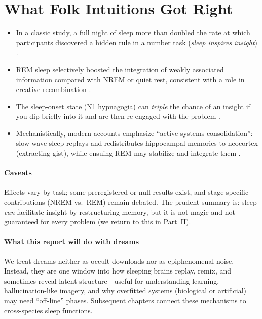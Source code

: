 \section{What Folk Intuitions Got Right}\label{sec:reconstructing}

\begin{itemize}
  \item In a classic study, a full night of sleep more than doubled the rate at which participants discovered a hidden rule in a number task (\emph{sleep inspires insight}) \citep{wagner2004}.
  \item REM sleep selectively boosted the integration of weakly associated information compared with NREM or quiet rest, consistent with a role in creative recombination \citep{cai2009}.
  \item The sleep-onset state (N1 hypnagogia) can \emph{triple} the chance of an insight if you dip briefly into it and are then re-engaged with the problem \citep{lacaux2021}.
  \item Mechanistically, modern accounts emphasize “active systems consolidation”: slow-wave sleep replays and redistributes hippocampal memories to neocortex (extracting gist), while ensuing REM may stabilize and integrate them \citep{diekelmann2010}.
\end{itemize}

\paragraph{Caveats}
Effects vary by task; some preregistered or null results exist, and stage-specific contributions (NREM vs.\ REM) remain debated. The prudent summary is: sleep \emph{can} facilitate insight by restructuring memory, but it is not magic and not guaranteed for every problem (we return to this in Part~II).

\paragraph{What this report will do with dreams}
We treat dreams neither as occult downloads nor as epiphenomenal noise. Instead, they are one window into how sleeping brains replay, remix, and sometimes reveal latent structure—useful for understanding learning, hallucination-like imagery, and why overfitted systems (biological or artificial) may need “off-line” phases. Subsequent chapters connect these mechanisms to cross-species sleep functions.